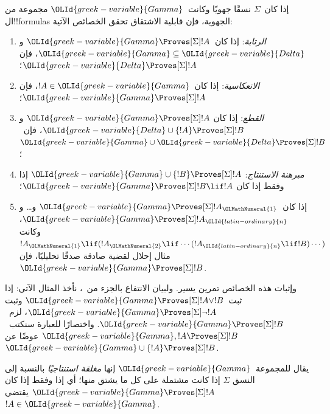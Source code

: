\documentclass[../../../include/open-logic-section]{subfiles}
\begin{document}


\begin{prop}
  إذا كان~$\Sigma$ نسقًا جهويًا وكانت~$\OLId{greek-variable}{Gamma}$ مجموعة من ال!!{formula}s
  الجهوية، فإن قابلية الاشتقاق تحقق الخصائص الآتية:
  \begin{enumerate}
  \item{} \emph{الرتابة}: إذا
    كان~$\OLId{greek-variable}{Gamma} \Proves[\Sigma] !A$ و$\OLId{greek-variable}{Gamma} \subseteq \OLId{greek-variable}{Delta}$، فإن
    $\OLId{greek-variable}{Delta} \Proves[\Sigma] !A$؛
  \item{}
    \emph{الانعكاسية}: إذا كان~$!A \in \OLId{greek-variable}{Gamma}$، فإن
    $\OLId{greek-variable}{Gamma} \Proves[\Sigma] !A$؛
  \item{} \emph{القطع}: إذا كان
    $\OLId{greek-variable}{Gamma} \Proves[\Sigma] !A$ و$\OLId{greek-variable}{Delta} \cup \{!A\}
    \Proves[\Sigma] !B$، فإن~$\OLId{greek-variable}{Gamma} \cup \OLId{greek-variable}{Delta} \Proves[\Sigma] !B$؛
  \item{} \emph{مبرهنة الاستنتاج}:
    $\OLId{greek-variable}{Gamma} \cup \{!B\} \Proves[\Sigma] !A$ إذا وفقط إذا كان
    $\OLId{greek-variable}{Gamma} \Proves[\Sigma] !B \lif !A$؛
  \item {}%
    إذا كان~$\OLId{greek-variable}{Gamma} \Proves[\Sigma] !A_\OLMathNumeral{1}$ و\dots{} و
    $\OLId{greek-variable}{Gamma} \Proves[\Sigma] !A_\OLId{latin-ordinary}{n}$، وكانت
    $!A_\OLMathNumeral{1} \lif (!A_\OLMathNumeral{2} \lif \cdots (!A_\OLId{latin-ordinary}{n} \lif !B)\cdots)$ مثال إحلال
    لقضية صادقة صدقًا تحليليًا، فإن~$\OLId{greek-variable}{Gamma} \Proves[\Sigma] !B$.
  \end{enumerate}
\end{prop}

وإثبات هذه الخصائص تمرين يسير. ولبيان الانتفاع بالجزء
 من~،
نأخذ المثال الآتي: إذا ثبت~$\OLId{greek-variable}{Gamma} \Proves[\Sigma] !A \lor !B$ وثبت
$\OLId{greek-variable}{Gamma} \Proves[\Sigma] \lnot !A$، لزم~$\OLId{greek-variable}{Gamma} \Proves[\Sigma] !B$.
واختصارًا للعبارة سنكتب~$\OLId{greek-variable}{Gamma}, !A \Proves[\Sigma] !B$ عوضًا عن
$\OLId{greek-variable}{Gamma} \cup \{!A\} \Proves[\Sigma] !B$.

\begin{defn}
  يقال للمجموعة~$\OLId{greek-variable}{Gamma}$ إنها \emph{مغلقة استنتاجيًا} بالنسبة إلى النسق
  $\Sigma$ إذا كانت مشتملة على كل ما يشتق منها؛ أي إذا وفقط إذا كان
  $\OLId{greek-variable}{Gamma} \Proves[\Sigma] !A$ يقتضي $!A \in \OLId{greek-variable}{Gamma}$.
\end{defn}
\end{document}
